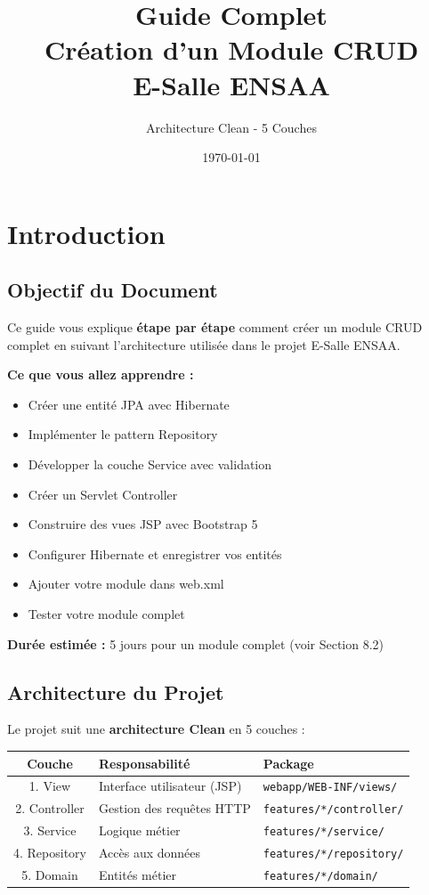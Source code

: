 \documentclass[12pt,a4paper]{article}
\title{\textbf{Guide Complet\\Création d'un Module CRUD\\E-Salle ENSAA}}
\author{Architecture Clean - 5 Couches}
\date{\today}
\begin{document}
\maketitle
\tableofcontents
\newpage

\section{Introduction}

\subsection{Objectif du Document}

Ce guide vous explique \textbf{étape par étape} comment créer un module CRUD complet en suivant l'architecture utilisée dans le projet E-Salle ENSAA.

\textbf{Ce que vous allez apprendre :}
\begin{itemize}
    \item Créer une entité JPA avec Hibernate
    \item Implémenter le pattern Repository
    \item Développer la couche Service avec validation
    \item Créer un Servlet Controller
    \item Construire des vues JSP avec Bootstrap 5
    \item Configurer Hibernate et enregistrer vos entités
    \item Ajouter votre module dans web.xml
    \item Tester votre module complet
\end{itemize}

\textbf{Durée estimée :} 5 jours pour un module complet (voir Section 8.2)

\subsection{Architecture du Projet}

Le projet suit une \textbf{architecture Clean} en 5 couches :

\begin{center}
\begin{tabular}{|c|l|l|}
\hline
\textbf{Couche} & \textbf{Responsabilité} & \textbf{Package} \\
\hline
1. View & Interface utilisateur (JSP) & \texttt{webapp/WEB-INF/views/} \\
\hline
2. Controller & Gestion des requêtes HTTP & \texttt{features/*/controller/} \\
\hline
3. Service & Logique métier & \texttt{features/*/service/} \\
\hline
4. Repository & Accès aux données & \texttt{features/*/repository/} \\
\hline
5. Domain & Entités métier & \texttt{features/*/domain/} \\
\hline
\end{tabular}
\end{center}
\end{document}

